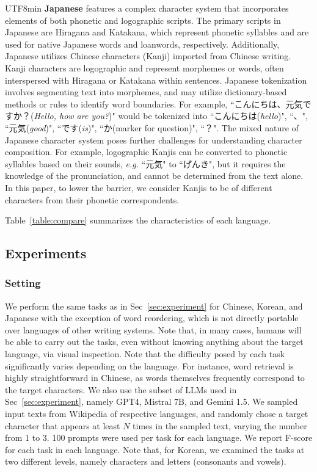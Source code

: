 \documentclass{article}
\theoremstyle{plain}
\theoremstyle{definition}
\theoremstyle{remark}
\begin{document}
\begin{CJK}{UTF8}{min}
\textbf{Japanese} features a complex character system that incorporates elements of both phonetic and logographic scripts. The primary scripts in Japanese are Hiragana and Katakana, which represent phonetic syllables and are used for native Japanese words and loanwords, respectively. Additionally, Japanese utilizes Chinese characters (Kanji) imported from Chinese writing. Kanji characters are logographic and represent morphemes or words, often interspersed with Hiragana or Katakana within sentences. Japanese tokenization involves segmenting text into morphemes, and may utilize dictionary-based methods or rules to identify word boundaries. For example, ``こんにちは、元気ですか？(\textit{Hello, how are you?})" would be tokenized into ``こんにちは(\textit{hello})", ``、", ``元気(\textit{good})", ``です(\textit{is})", ``か(marker for question)", ``？". The mixed nature of Japanese character system poses further challenges for understanding character composition. For example, logographic Kanjis can be converted to phonetic syllables based on their sounds, \textit{e.g.} ``元気" to ``げんき", but it requires the knowledge of the pronunciation, and cannot be determined from the text alone. In this paper, to lower the barrier, we consider Kanjis to be of different characters from their phonetic correspondents.

Table~\ref{table:compare} summarizes the characteristics of each language.





\subsection{Experiments}
\subsubsection{Setting}
We perform the same tasks as in Sec~\ref{sec:experiment} for Chinese, Korean, and Japanese with the exception of word reordering, which is not directly portable over languages of other writing systems. Note that, in many cases, humans will be able to carry out the tasks, even without knowing anything about the target language, via visual inspection. Note that the difficulty posed by each task significantly varies depending on the language. For instance, word retrieval is highly straightforward in Chinese, as words themselves frequently correspond to the target characters. We also use the subset of LLMs used in Sec~\ref{sec:experiment}, namely GPT4, Mistral 7B, and Gemini 1.5. We sampled input texts from Wikipedia of respective languages, and randomly chose a target character that appears at least $N$ times in the sampled text, varying the number from 1 to 3. 100 prompts were used per task for each language. We report F-score for each task in each language. Note that, for Korean, we examined the tasks at two different levels, namely characters and letters (consonants and vowels).


\end{CJK}
\end{document}
